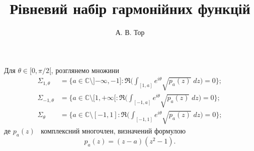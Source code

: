 \documentclass[]{article}
\title{\sffamily Рівневий набір гармонійних функцій}
\author{А. В. Тор}
\date{}
\theoremstyle{plain}
\begin{document}
 
\maketitle
Для $\theta \in [0, \pi/2[$, розглянемо множини
\begin{align*}
    \Sigma_{1,\theta} &= \biggl\{ a \in \mathbb{C} \setminus ]{-\infty}, -1] : \Re \biggl( \int_{[1,a]} e^{i\theta} \sqrt{p_a(z)} \; dz \biggr) = 0 \biggr\}; \\
    \Sigma_{-1,\theta} &= \biggl\{ a \in \mathbb{C} \setminus [1, +\infty[ : \Re \biggl( \int_{[-1,a]} e^{i\theta} \sqrt{p_a(z)} \; dz \biggr) = 0 \biggr\}; \\
    \Sigma_{\theta} &= \biggl\{ a \in \mathbb{C} \setminus [-1, 1] : \Re \biggl( \int_{[-1,1]} e^{i\theta} \sqrt{p_a(z)} \; dz \biggr) = 0 \biggr\};
\end{align*}
де $p_a(z)$ \textemdash\ комплексний многочлен, визначений формулою
\begin{equation*}
    p_a(z) = (z - a)(z^2 - 1).
\end{equation*}
\end{document}
